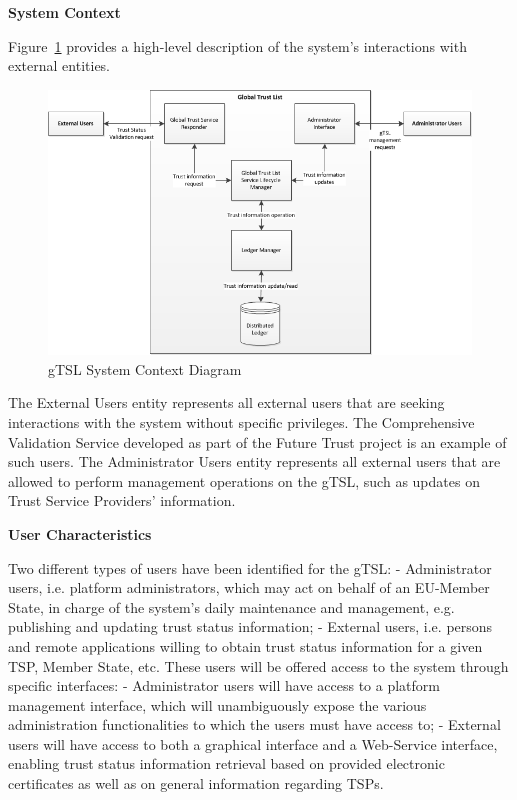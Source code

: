 \documentclass{tnreport}
\begin{document}
\textbf{System Context}

Figure~\ref{fig:system-context-diagram} provides a high-level description of the system’s interactions with external entities.

\begin{figure}[h]
	\centering
	\includegraphics[scale=0.8]{figures/gTSL-SystemContextDiagram}
	\caption{gTSL System Context Diagram}
	\label{fig:system-context-diagram}
\end{figure}

The External Users entity represents all external users that are seeking interactions with the system without specific privileges. The Comprehensive Validation Service developed as part of the Future Trust project is an example of such users.
The Administrator Users entity represents all external users that are allowed to perform management operations on the gTSL, such as updates on Trust Service Providers’ information.

\textbf{User Characteristics}

Two different types of users have been identified for the gTSL:
- Administrator users, i.e. platform administrators, which may act on behalf of an EU-Member State, in charge of the system’s daily maintenance and management, e.g. publishing and updating trust status information;
- External users, i.e. persons and remote applications willing to obtain trust status information for a given TSP, Member State, etc.
These users will be offered access to the system through specific interfaces:
- Administrator users will have access to a platform management interface, which will unambiguously expose the various administration functionalities to which the users must have access to;
- External users will have access to both a graphical interface and a Web-Service interface, enabling trust status information retrieval based on provided electronic certificates as well as on general information regarding TSPs.
\end{document}
